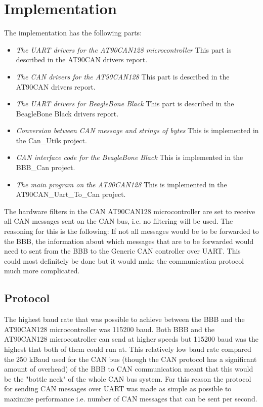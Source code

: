 
\section{Implementation}\label{sec:implementation}
The implementation has the following parts:

\begin{itemize}
   \item { \em The UART drivers for the AT90CAN128 microcontroller} \newline This part is described in the AT90CAN drivers report.
   \item { \em The CAN drivers for the AT90CAN128} \newline This part is described in the AT90CAN drivers report.
   \item { \em The UART drivers for BeagleBone Black} \newline This part is described in the BeagleBone Black drivers report.
   \item { \em Conversion between CAN message and strings of bytes } \newline This is implemented in the Can\_Utils project.
   \item { \em CAN interface code for the BeagleBone Black} \newline This is implemented in the BBB\_Can project.
   \item { \em The main program on the AT90CAN128} \newline This is implemented in the AT90CAN\_Uart\_To\_Can project.
\end{itemize}

The hardware filters in the CAN AT90CAN128 microcontroller are set to receive all CAN messages sent on the CAN bus, i.e. no filtering will be used. The reasoning for this is the following: 
If not all messages would be to be forwarded to the BBB, the information about which messages that are to be forwarded would need to sent from the BBB to the Generic CAN controller over UART. This could most definitely be done but it would make the communication protocol much more complicated.

\subsection{Protocol}
The highest baud rate that was possible to achieve between the BBB and the AT90CAN128 microcontroller was 115200 baud. Both BBB and the AT90CAN128 microcontroller can send at higher speeds but 115200 baud was the highest that both of them could run at. This relatively low baud rate compared the 250 kBaud used for the CAN bus (though the CAN protocol has a significant amount of overhead) of the BBB to CAN communication meant that this would be the "bottle neck" of the whole CAN bus system. For this reason the protocol for sending CAN messages over UART was made as simple as possible to maximize performance i.e. number of CAN messages that can be sent per second. 

